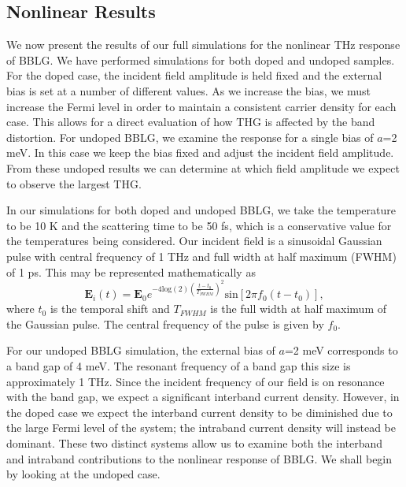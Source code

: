 \documentclass[twocolumn,secnumarabic,amssymb, nobibnotes, aps, prd, superscriptaddress]{revtex4-1}
\begin{document}
\subsection{Nonlinear Results}
We now present the results of our full simulations for the nonlinear THz response of BBLG. We have performed simulations for both doped and undoped samples. For the doped case, the incident field amplitude is held fixed and the external bias is set at a number of different values. As we increase the bias, we must increase the Fermi level in order to maintain a consistent carrier density for each case. This allows for a direct evaluation of how THG is affected by the band distortion. For undoped BBLG, we examine the response for a single bias of $a$=2 meV. In this case we keep the bias fixed and adjust the incident field amplitude. From these undoped results we can determine at which field amplitude we expect to observe the largest THG. 

In our simulations for both doped and undoped BBLG, we take the temperature to be 10 K and the scattering time to be 50 fs, which is a conservative value for the temperatures being considered. Our incident field is a sinusoidal Gaussian pulse with central frequency of 1 THz and full width at half maximum (FWHM) of 1 ps. This may be represented mathematically as
\begin{equation}
\mathbf{E}_{i}(t)=\mathbf{E}_{0}e^{-4\textrm{log}(2)\left(\frac{t-t_{0}}{T_{FWHM}}\right)^{2}}\textrm{sin}\left[2\pi f_{0}(t-t_{0})\right],\label{eq:incident}
\end{equation} where $t_{0}$ is the temporal shift and $T_{FWHM}$ is the full width at half maximum of the Gaussian pulse. The central frequency of the pulse is given by $f_{0}$.

For our undoped BBLG simulation, the external bias of $a$=2 meV corresponds to a band gap of 4 meV. The resonant frequency of a band gap this size is approximately 1 THz. Since the incident frequency of our field is on resonance with the band gap, we expect a significant interband current density. However, in the doped case we expect the interband current density to be diminished due to the large Fermi level of the system; the intraband current density will instead be dominant. These two distinct systems allow us to examine both the interband and intraband contributions to the nonlinear response of BBLG. We shall begin by looking at the undoped case.  
\end{document}
